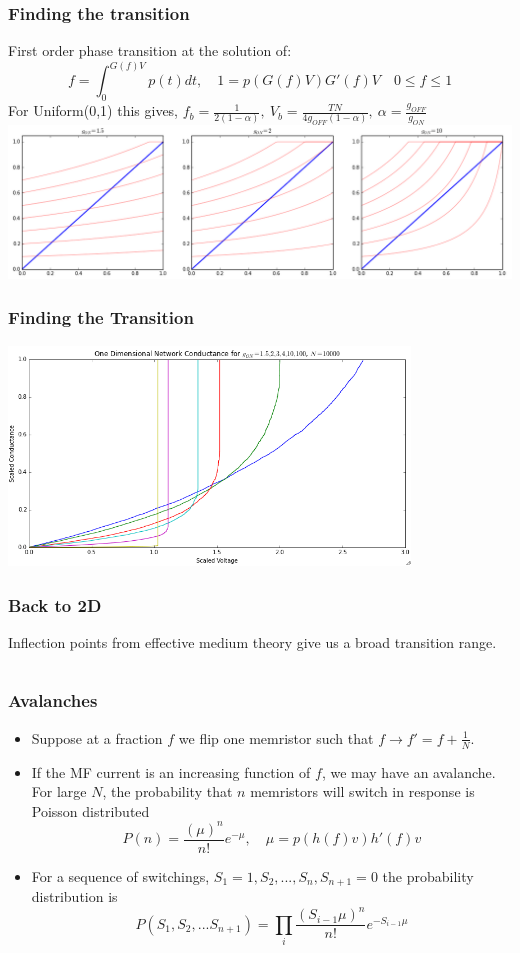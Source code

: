 \documentclass[mathserif]{beamer}
\begin{document}
\begin{frame}
\frametitle{Finding the transition}
First order phase transition at the solution of:
$$f = \int_0^{G(f)V} p(t) dt,  \quad 1 = p(G(f)V)G'(f)V \quad 0 \le f \le 1$$
For Uniform(0,1) this gives, 
$f_b = \frac{1}{2(1-\alpha)}, \: V_b = \frac{TN}{4g_{OFF}(1-\alpha)},
 \: \alpha = \frac{g_{OFF}}{g_{ON}}$
\centering
\includegraphics[width=\textwidth]{SC_1D_Uniform01.png}
\end{frame}

\begin{frame}
\frametitle{Finding the Transition}
\centering
\includegraphics[width=0.8\textwidth]{1D_Cond.png}

\end{frame}

\begin{frame}
\frametitle{Back to 2D}
Inflection points from effective medium theory give us a broad transition range.
\begin{columns}
\end{columns}

\end{frame}

\begin{frame}
\frametitle{Avalanches}
\begin{itemize}
\item Suppose at a fraction $f$ we flip one memristor such that $f\to f'= f + \frac{1}{N}$.
\item If the MF current is an increasing function of $f$, we may have an avalanche. For large
$N$, the probability that $n$ memristors will switch in response is Poisson distributed
$$P(n) = \frac{(\mu)^n}{n!} e^{-\mu}, \quad \mu = p(h(f)v)h'(f)v$$
\item For a sequence of switchings, $S_1=1, S_2, ...,S_n, S_{n+1}=0$ the
probability distribution is
$$P(S_1, S_2, ...S_{n+1}) = \prod_i  \frac{(S_{i-1}\mu)^n}{n!} e^{-S_{i-1}\mu} $$

\end{itemize}
\end{frame}
\end{document}

